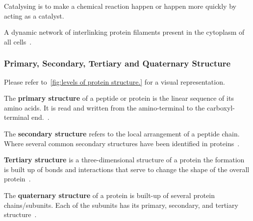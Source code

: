 \documentclass[]{final_report}
\begin{document}
\begin{definition}[Catalysing]
    Catalysing is to make a chemical reaction happen or happen more quickly by acting as a catalyst.
\end{definition}

\begin{definition}[Cytoskeleton]
    A dynamic network of interlinking protein filaments present in the cytoplasm of all cells~\cite{zvelebil_understanding_2008}. 
\end{definition}

\subsubsection{Primary, Secondary, Tertiary and Quaternary Structure}

Please refer to~\ref{fig:levels of protein structure.} for a visual representation.

The \textbf{primary structure} of a peptide or protein is the linear sequence of its amino acids. It is read and written from the amino-terminal to the carboxyl-terminal end.~\cite{sun_overview_2004}.

The \textbf{secondary structure} refers to the local arrangement of a peptide chain. Where several common secondary structures have been identified in proteins~\cite{sun_overview_2004}.

\textbf{Tertiary structure} is a three-dimensional structure of a protein the formation is built up of bonds and interactions that serve to change the shape of the overall protein~\cite{godbey_chapter_2022}.

The \textbf{quaternary structure} of a protein is built-up of several protein chains/subunits. Each of the subunits has its primary, secondary, and tertiary structure~\cite{ouellette_14_2015}.
\end{document}
